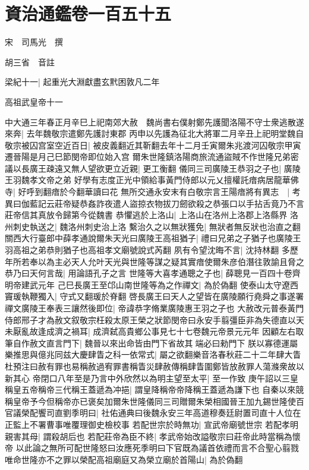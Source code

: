 \chapter{資治通鑑卷一百五十五}
宋　司馬光　撰

胡三省　音註

梁紀十一|{
	起重光大淵獻盡玄黓困敦凡二年}


高祖武皇帝十一

中大通三年春正月辛巳上祀南郊大赦　魏尚書右僕射鄭先護聞洛陽不守士衆逃散遂來奔|{
	去年魏敬宗遣鄭先護討東郡}
丙申以先護為征北大將軍二月辛丑上祀明堂魏自敬宗被囚宫室空近百日|{
	被皮義翻近其靳翻去年十二月壬寅爾朱兆渡河囚敬宗甲寅遷晉陽是月己巳節閔帝即位始入宫}
爾朱世隆鎮洛陽商旅流通盜賊不作世隆兄弟密議以長廣王疎遠又無人望欲更立近親|{
	更工衡翻}
儀同三司廣陵王恭羽之子也|{
	廣陵王羽魏孝文帝之弟}
好學有志度正光中領給事黃門侍郎以元乂擅權託瘖病居龍華佛寺|{
	好呼到翻瘖於今翻華讀曰花}
無所交通永安末有白敬宗言王陽瘖將有異志　|{
	考異曰伽藍記云莊帝疑恭姦詐夜遣人盜掠衣物拔刀劒欲殺之恭張口以手拈舌竟乃不言莊帝信其真放令歸第今從魏書}
恭懼逃於上洛山|{
	上洛山在洛州上洛郡上洛縣界}
洛州刺史執送之|{
	魏洛州刺史治上洛}
繫治久之以無狀獲免|{
	無狀者無反狀也治直之翻}
關西大行臺郎中薛孝通說爾朱天光曰廣陵王高祖猶子|{
	禮曰兄弟之子猶子也廣陵王羽高祖之弟恭則猶子也高祖孝文廟號說式芮翻}
夙有令望沈晦不言|{
	沈持林翻}
多歷年所若奉以為主必天人允叶天光與世隆等謀之疑其實瘖使爾朱彦伯潛往敦諭且脅之恭乃曰天何言哉|{
	用論語孔子之言}
世隆等大喜孝通聰之子也|{
	薛聰見一百四十卷齊明帝建武元年}
己巳長廣王至邙山南世隆等為之作禪文|{
	為於偽翻}
使泰山太守遼西竇瑗執鞭獨入|{
	守式又翻瑗於脊翻}
啓長廣王曰天人之望皆在廣陵願行堯舜之事遂署禪文廣陵王奉表三讓然後即位|{
	帝諱恭字脩業廣陵惠王羽之子也}
大赦改元普泰黃門侍郎邢子才為赦文叙敬宗枉殺太原王榮之狀節閔帝曰永安手翦彊臣非為失德直以天未厭亂故逢成濟之禍耳|{
	成濟弑高貴鄉公事見七十七卷魏元帝景元元年}
因顧左右取筆自作赦文直言門下|{
	魏晉以來出命皆由門下省故其端必曰勑門下}
朕以寡德運屬樂推思與億兆同兹大慶肆眚之科一依常式|{
	屬之欲翻樂音洛春秋莊二十二年肆大眚杜預注曰赦有罪也易稱赦過宥罪書稱眚災肆赦傳稱肆眚圍鄭皆放赦罪人蕩滌衆故以新其心}
帝閉口八年至是乃言中外欣然以為明主望至太平|{
	至一作致}
庚午詔以三皇稱皇五帝稱帝三代稱王蓋遞為冲挹|{
	謂皇降稱帝帝降稱王蓋遞為謙下也}
自秦以來競稱皇帝予今但稱帝亦已褒矣加爾朱世隆儀同三司贈爾朱榮相國晉王加九錫世隆使百官議榮配饗司直劉季明曰|{
	社佑通典曰後魏永安三年高道穆奏廷尉置司直十人位在正監上不署曹事唯覆理御史檢校事}
若配世宗於時無功|{
	宣武帝廟號世宗}
若配孝明親害其母|{
	謂殺胡后也}
若配莊帝為臣不終|{
	孝武帝始改謚敬宗曰莊帝此時當稱為懷帝}
以此論之無所可配世隆怒曰汝應死季明曰下官既為議首依禮而言不合聖心翦戮唯命世隆亦不之罪以榮配高祖廟庭又為榮立廟於首陽山|{
	為於偽翻}
